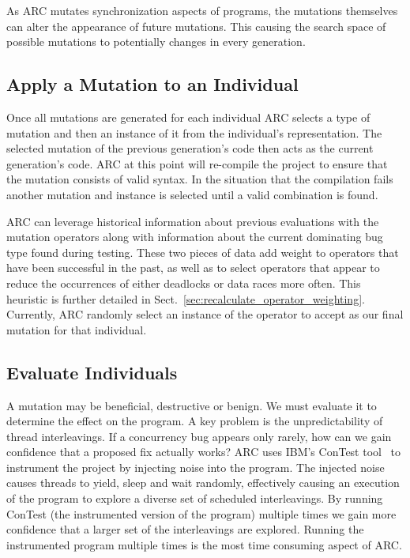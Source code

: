 \documentclass{llncs}
\begin{document}
As ARC mutates synchronization aspects of programs, the mutations themselves
can alter the appearance of future mutations. This causing the search space of
possible mutations to potentially changes in every generation.

\subsection{Apply a Mutation to an Individual}
\label{sec:mutate_individuals}

Once all mutations are generated for each individual ARC selects a type of
mutation and then an instance of it from the individual's representation. The
selected mutation of the previous generation's code then acts as the current
generation's code. ARC at this point will re-compile the project to ensure that
the mutation consists of valid syntax. In the situation that the compilation
fails another mutation and instance is selected until a valid combination is
found.

ARC can leverage historical information about previous evaluations with the
mutation operators along with information about the current dominating bug type
found during testing. These two pieces of data add weight to operators
that have been successful in the past, as well as to select operators that
appear to reduce the occurrences of either deadlocks or data races more often.
This heuristic is further detailed in
Sect.~\ref{sec:recalculate_operator_weighting}. Currently, ARC randomly select
an instance of the operator to accept as our final mutation for that
individual.

\subsection{Evaluate Individuals}
\label{sec:evalute_individuals}

A mutation may be beneficial, destructive or benign. We must evaluate it to
determine the effect on the program. A key problem is the unpredictability of
thread interleavings. If a concurrency bug appears only rarely, how can we gain
confidence that a proposed fix actually works? ARC uses IBM's ConTest
tool~\cite{EFN+02} to instrument the project by injecting noise into the
program. The injected noise causes threads to yield, sleep and wait randomly,
effectively causing an execution of the program to explore a diverse set of
scheduled interleavings. By running ConTest (the instrumented version of the
program) multiple times we gain more confidence that a larger set of the
interleavings are explored. Running the instrumented program multiple times is
the most time consuming aspect of ARC.
\end{document}
